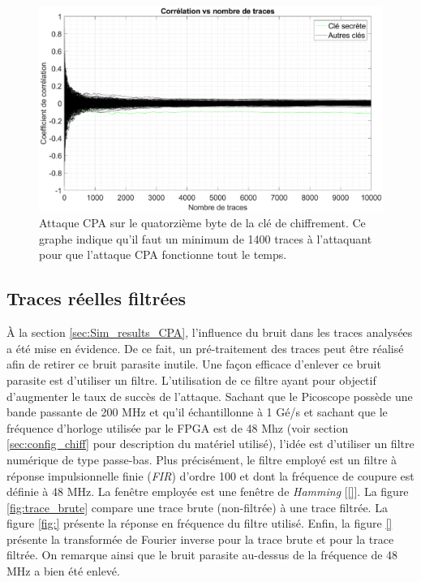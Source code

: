 \documentclass[oneside]{book}
\begin{document}
\begin{figure}[htbp]
    \hspace{-2.8cm}
    \includegraphics[scale=0.65]{image/real_result_corr_vs_nb_traces_CPA}
    \caption{Attaque CPA sur le quatorzième byte de la clé de chiffrement. Ce graphe indique qu'il faut un minimum de 1400 traces à l'attaquant pour que l'attaque CPA fonctionne tout le temps.}
    \label{fig:real_result_corr_vs_nb_traces_CPA} 
\end{figure}

\newpage

\subsection{Traces réelles filtrées}
\label{sec:filter}

À la section \ref{sec:Sim_results_CPA}, l'influence du bruit dans les traces analysées a été mise en évidence. De ce fait, un pré-traitement des traces peut être réalisé afin de retirer ce bruit parasite inutile. Une façon efficace d'enlever ce bruit parasite est d'utiliser un filtre. L'utilisation de ce filtre ayant pour objectif d'augmenter le taux de succès de l'attaque. Sachant que le Picoscope possède une bande passante de 200 MHz et qu'il échantillonne à 1 Gé/s et sachant que le fréquence d'horloge utilisée par le FPGA est de 48 Mhz (voir section \ref{sec:config_chiff} pour description du matériel utilisé), l'idée est d'utiliser un filtre numérique de type passe-bas. Plus précisément, le filtre employé est un filtre à réponse impulsionnelle finie (\textit{FIR}) d'ordre 100 et dont la fréquence de coupure est définie à 48 MHz. La fenêtre employée est une fenêtre de \textit{Hamming} [\ref{}]. La figure \ref{fig:trace_brute} compare une trace brute (non-filtrée) à une trace filtrée. La figure \ref{fig:} présente la réponse en fréquence du filtre utilisé. Enfin, la figure \ref{} présente la transformée de Fourier inverse pour la trace brute et pour la trace filtrée. On remarque ainsi que le bruit parasite au-dessus de la fréquence de 48 MHz a bien été enlevé.
\end{document}
